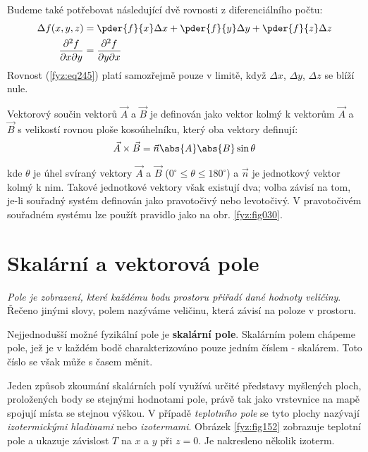     Budeme také potřebovat následující dvě rovnosti z dife\-ren\-ci\-ál\-ní\-ho počtu:
    \begin{subequations} 
      \begin{align} 
        \Delta f(x,y,z)                      
          &=  \pder{f}{x}\Delta x +
              \pder{f}{y}\Delta y + 
              \pder{f}{z}\Delta z                     \label{fyz:eq245}        \\
        \frac{\partial^2f}{\partial x\partial y}
          &=\frac{\partial^2f}{\partial y\partial x}  \label{fyz:eq246}
      \end{align}
    \end{subequations}
    Rovnost (\ref{fyz:eq245}) platí samozřejmě pouze v limitě, když \(\Delta x\), \(\Delta 
    y\), \(\Delta z\) se blíží nule.
   
    Vektorový součin vektorů $\vec{A}$ a $\vec{B}$ je definován jako vektor kolmý k vektorům 
    $\vec{A}$ a $\vec{B}$ s velikostí rovnou ploše kosoúhelníku, který oba vektory definují:
    \begin{equation}\label{fyz:eq247}
      \vec{A}\times\vec{B} = \vec{n}\abs{A}\abs{B}\sin\theta
    \end{equation} 

    kde $\theta$ je úhel svíraný vektory $\vec{A}$ a $\vec{B}$ ($0^\circ\leq\theta\leq180^\circ$) a 
    $\vec{n}$ je jednotkový vektor kolmý k nim. Takové jednotkové vektory však existují dva; volba 
    závisí na tom, je-li souřadný systém definován jako pravotočivý nebo levotočivý. V pravotočivém 
    souřadném systému lze použít pravidlo jako na obr. \ref{fyz:fig030}.
      
  \section{Skalární a vektorová pole}\label{fyz:IIchapIIsecIII}
    \emph{Pole je zobrazení, které každému bodu prostoru přiřadí dané hodnoty veličiny}. Řečeno 
    jinými slovy, polem nazýváme veličinu, která závisí na poloze v prostoru.
    
    Nejjednodušší možné fyzikální pole je \textbf{ska\-lá\-rní pole}. Skalárním polem chápeme 
    pole, jež je v každém bodě charakterizováno pouze jedním číslem - skalárem. Toto číslo se 
    však může s časem měnit.
    
    Jeden způsob zkoumání skalár\-ních polí využívá určité představy myšle\-ných ploch, 
    pro\-ložených body se stejnými hodnotami pole, právě tak jako vrstevnice na mapě spojují 
    místa se stejnou výškou. V případě \emph{teplotního pole} se tyto plochy nazývají 
    \emph{izotermickými hladinami} nebo \emph{izotermami}. Obrázek \ref{fyz:fig152} zobrazuje 
    teplotní pole a ukazuje závislost \(T\) na \(x\) a \(y\) při \(z = 0\). Je nakresleno několik 
    izoterm.

